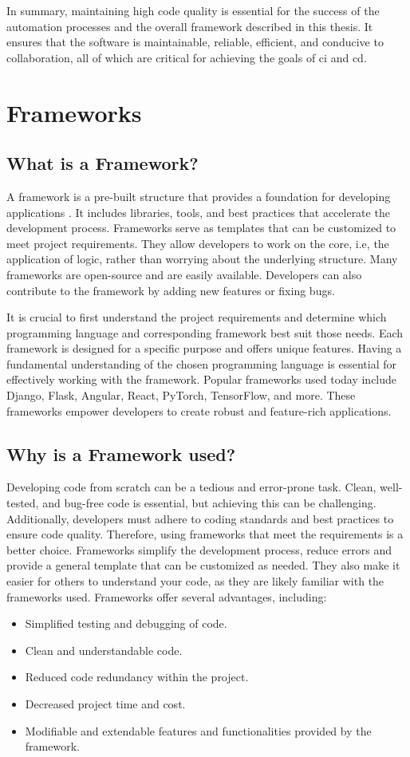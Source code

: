 In summary, maintaining high code quality is essential for the success of the automation processes and the overall framework described in this thesis. It 
ensures that the software is maintainable, reliable, efficient, and conducive to collaboration, all of which are critical for achieving the goals of \acrlong{ci} 
and \acrlong{cd}.

\section{Frameworks}
\subsection{What is a Framework?}
A framework is a pre-built structure that provides a foundation for developing applications \cite{framework}. It includes libraries, tools, and best practices that accelerate 
the development process. Frameworks serve as templates that can be customized to meet project requirements. They allow developers to work on the core, i.e,
the application of logic, rather than worrying about the underlying structure. Many frameworks are open-source and are easily available. Developers can also
contribute to the framework by adding new features or fixing bugs.

It is crucial to first understand the project requirements and determine which programming language and corresponding framework best suit those needs. 
Each framework is designed for a specific purpose and offers unique features. Having a fundamental understanding of the chosen programming language is 
essential for effectively working with the framework. Popular frameworks used today include Django, Flask, Angular, React, PyTorch, TensorFlow, and more. 
These frameworks empower developers to create robust and feature-rich applications.

\subsection{Why is a Framework used?}
Developing code from scratch can be a tedious and error-prone task. Clean, well-tested, and bug-free code is essential, but achieving this can be challenging.
Additionally, developers must adhere to coding standards and best practices to ensure code quality. Therefore, using frameworks that meet the requirements is
a better choice. Frameworks simplify the development process, reduce errors and provide a general template that can be customized as needed. They also make it
easier for others to understand your code, as they are likely familiar with the frameworks used. Frameworks offer several advantages, including:
\begin{itemize}
    \item Simplified testing and debugging of code.
    \item Clean and understandable code.
    \item Reduced code redundancy within the project.
    \item Decreased project time and cost.
    \item Modifiable and extendable features and functionalities provided by the framework.
\end{itemize}

